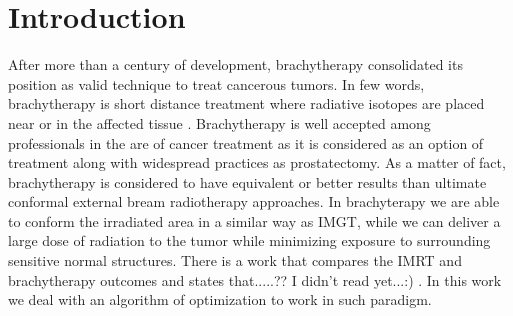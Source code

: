 \documentclass[12pt]{article}
\theoremstyle{definition}
\begin{document}
\section{Introduction}
After more than a century of development, brachytherapy consolidated its position as valid technique to treat cancerous tumors. In few words, brachytherapy is short distance treatment where radiative isotopes are placed near or in the affected tissue \cite{Dahiya:2006}.  Brachytherapy is well accepted among professionals in the are of cancer treatment as it is considered as an option of treatment along with widespread practices as prostatectomy. As a matter of fact, brachytherapy is considered to have equivalent or better results than ultimate conformal external bream radiotherapy approaches\cite{Tward2006}. In brachyterapy we are able to conform the irradiated area in a similar way as IMGT, while we can deliver a  large  dose  of  radiation  to  the  tumor  while  minimizing  exposure  to  surrounding  sensitive  normal  structures\cite{Devlin2016}. There is a work that compares the IMRT and brachytherapy outcomes \cite{tsubokura2018comparison} and states that.....??  I didn't read yet...:) . In this work we deal with an algorithm of optimization to work in such paradigm.
\end{document}
